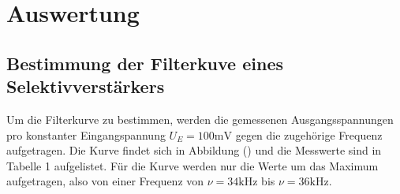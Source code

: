 \section{Auswertung}
\label{sec:Auswertung}
\subsection{Bestimmung der Filterkuve eines Selektivverstärkers}
Um die Filterkurve zu bestimmen, werden die gemessenen Ausgangsspannungen pro konstanter Eingangspannung $U_E = 100\si{\milli\volt}$ gegen die zugehörige Frequenz aufgetragen.
Die Kurve findet sich in Abbildung () und die Messwerte sind in Tabelle 1 aufgelistet. Für die Kurve werden nur die Werte um das Maximum aufgetragen, also von einer Frequenz von $\nu = 34 \si{\kilo\hertz}$ bis $\nu = 36 \si{\kilo\hertz}$.

